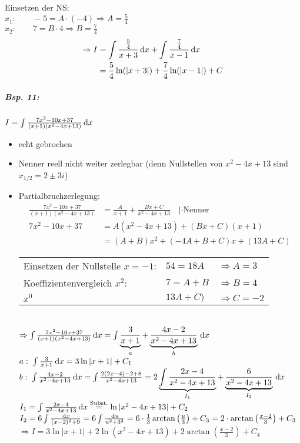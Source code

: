 Einsetzen der NS: \\
$x_1: \qquad -5 = A\cdot (-4) \Rightarrow A = \frac{5}{4}$\\
$x_2: \qquad 7 = B \cdot 4 \Rightarrow B=\frac{7}{4}$
\begin{align*}
\Rightarrow I &= \int \frac{\frac{5}{4}}{x+3}\,\mathrm{d}x+\int \frac{\frac{7}{4}}{x-1}\,\mathrm{d}x\\
 &= \frac{5}{4} \ln (|x+3|) + \frac{7}{4}\ln(|x-1|)+C
\end{align*}
\subparagraph{Bsp. 11:} $I=\int \frac{7x^2-10x+37}{(x+1)(x^2-4x+13)}\,\mathrm{d}x$
\begin{itemize}
\item echt gebrochen
\item Nenner reell nicht weiter zerlegbar (denn Nullstellen von $x^2-4x+13$ sind $x_{1/2}=2\pm3i$)
\item Partialbruchzerlegung:
\begin{align*}
\frac{7x^2-10x+37}{(x+1)(x^2-4x+13)}&=\frac{A}{x+1}+\frac{Bx+C}{x^2-4x+13} \quad |\cdot \text{Nenner}\\
7x^2-10x+37&=A(x^2-4x+13)+(Bx+C)(x+1)\\
&= (A+B)x^2+(-4A+B+C)x+(13A+C)
\end{align*}
\begin{tabular}{l l l}
Einsetzen der Nullstelle $x=-1$: & $54=18 A$ & $\Rightarrow A=3$\\
Koeffizientenvergleich $x^2$: & $7=A+B $ & $\Rightarrow B=4$\\
 $x^0$ & $13A+C)$ & $\Rightarrow C=-2$ 
\end{tabular}\\
$\Rightarrow \int \frac{7x^2-10x+37}{(x+1)(x^2-4x+13)}\,\mathrm{d}x=\int \underbrace{\frac{3}{x+1}}_{a}+ \underbrace{\frac{4x-2}{x^2-4x+13}}_{b}\,\mathrm{d}x $\\
$a: \; \int \frac{3}{x+1} \,\mathrm{d}x = 3 \ln|x+1| +C_1$\\
$b: \; \int \frac{4x-2}{x^2-4x+13}\,\mathrm{d}x=\int\frac{2(2x-4)-2+8}{x^2-4x+13}=2\underbrace{\int \frac{2x-4}{x^2-4x+13}}_{I_1}+\underbrace{\frac{6}{x^2-4x+13}}_{I_2}\,\mathrm{d}x$\\
$I_1 = \int \frac{2x-4}{x^2-4x+13}\,\mathrm{d}x\overset{\text{Subst.}}{=}\ln|x^2-4x+13| + C_2$\\
$I_2 = 6\int \frac{\,\mathrm{d}x}{(x-2)^2+9}=6\int \frac{\,\mathrm{d}u}{u^2+3^2}=6\cdot \frac{1}{3}\arctan\left(\frac{u}{3}\right)+C_3=2\cdot\arctan\left(\frac{x-2}{3}\right)+C_3$\medskip\\
$\Rightarrow I = 3\ln|x+1| + 2 \ln\left(x^2-4x+13\right)+2\arctan\left(\frac{x-2}{3}\right)+C_4$
\end{itemize}

